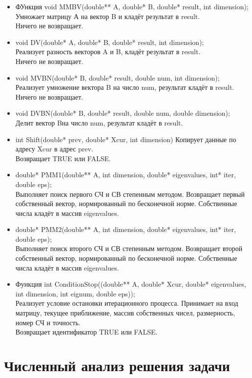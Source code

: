 \documentclass[12pt]{article}
\begin{document}
\begin{itemize}
\item ФУнкция void MMBV(double** A, double* B, double* result, int dimension);\\
Умножает матрицу А на вектор B и кладёт результат в result.\\
Ничего не возвращает.
\item void DV(double* A, double* B, double* result, int dimension);\\
Реализует разность векторов A и B, кладёт результат в result.\\
Ничего не возвращает.
\item void MVBN(double* B, double* result, double num, int dimension);
Реализует умножение вектора B  на число num, результат кладёт в result.\\
Ничего не возвращает.
\item void DVBN(double* B, double* result, double num, double dimension);\\
Делит вектор Bна число num, результат кладёт в result.
\item int Shift(double* prev, double* Xcur, int dimension)
Копирует данные по адресу Xcur в адрес prev.\\
Возвращает TRUE или FALSE.
\item double* PMM1(double** A, int dimension, double* eigenvalues, int* iter, double eps);\\
Выполняет поиск первого СЧ и СВ степенным методом. Возвращает первый собственный вектор, нормированный по бесконечной норме. Собственные числа кладёт в массив eigenvalues.
\item double* PMM2(double** A, int dimension, double* eigenvalues, int* iter, double eps);\\
Выполняет поиск второго СЧ и СВ степенным методом. Возвращает второй собственный вектор, нормированный по бесконечной норме. Собственные числа кладёт в массив eigenvalues.

\item Функция int ConditionStop((double** A, double* Xcur, double* eigenvalues, int dimension, int eignum, double eps));\\
Реализует условие остановки итерационного процесса. Принимает на вход матрицу, текущее приближение, массив собственных чисел, размерность, номер СЧ и точность.\\ Возвращает идентификатор TRUE или FALSE.

\end{itemize}



\section{Численный анализ решения задачи}
\end{document}
